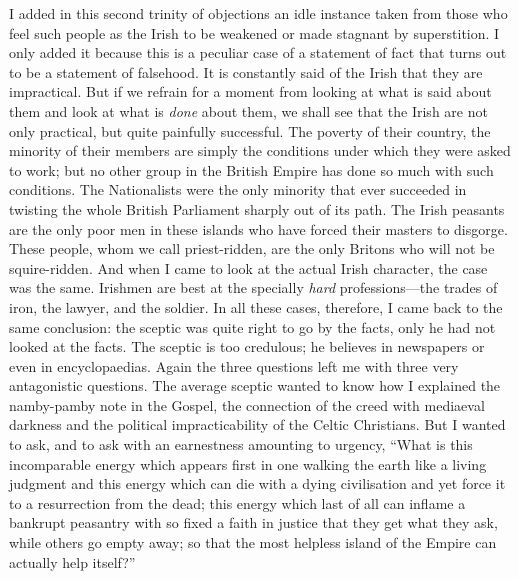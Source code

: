 \documentclass{book}
\begin{document}
I added in this second trinity of objections an idle instance taken from those who feel such people as the Irish to be weakened or made stagnant by superstition. I only added it because this is a peculiar case of a statement of fact that turns out to be a statement of falsehood. It is constantly said of the Irish that they are impractical. But if we refrain for a moment from looking at what is said about them and look at what is \emph{done} about them, we shall see that the Irish are not only practical, but quite painfully successful. The poverty of their country, the minority of their members are simply the conditions under which they were asked to work; but no other group in the British Empire has done so much with such conditions. The Nationalists were the only minority that ever succeeded in twisting the whole British Parliament sharply out of its path. The Irish peasants are the only poor men in these islands who have forced their masters to disgorge. These people, whom we call priest-ridden, are the only Britons who will not be squire-ridden. And when I came to look at the actual Irish character, the case was the same. Irishmen are best at the specially \emph{hard} professions—the trades of iron, the lawyer, and the soldier. In all these cases, therefore, I came back to the same conclusion: the sceptic was quite right to go by the facts, only he had not looked at the facts. The sceptic is too credulous; he believes in newspapers or even in encyclopaedias. Again the three questions left me with three very antagonistic questions. The average sceptic wanted to know how I explained the namby-pamby note in the Gospel, the connection of the creed with mediaeval darkness and the political impracticability of the Celtic Christians. But I wanted to ask, and to ask with an earnestness amounting to urgency, “What is this incomparable energy which appears first in one walking the earth like a living judgment and this energy which can die with a dying civilisation and yet force it to a resurrection from the dead; this energy which last of all can inflame a bankrupt peasantry with so fixed a faith in justice that they get what they ask, while others go empty away; so that the most helpless island of the Empire can actually help itself?”
\end{document}
